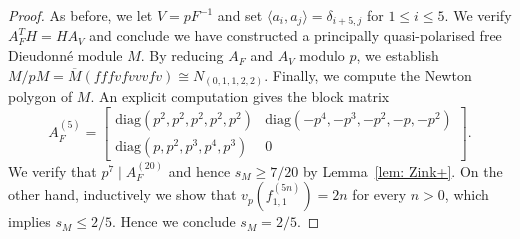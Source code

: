 \documentclass[11pt,table]{amsart}
\numberwithin{equation}{section}
\theoremstyle{definition}
\theoremstyle{remark}
\theoremstyle{remark}
\begin{document}
\begin{proof}
As before, we let $V=pF^{-1}$ and set $\langle a_i,a_j\rangle=\delta_{i+5,j}$ for $1\leq i \leq 5$. We verify $A_F^TH=HA_V$ and conclude we have constructed a principally quasi-polarised free Dieudonn\'{e} module $M$. By reducing $A_F$ and $A_V$ modulo $p$, we establish $M/pM=\overline{M}(fffvfvvvfv) \cong N_{(0,1,1,2,2)}.$ Finally, we compute the Newton polygon of $M$. An explicit computation gives the block matrix
\[
A_F^{(5)} = \begin{bmatrix}
    \mathrm{diag}(p^2, p^2, p^2, p^2, p^2) & \mathrm{diag}(-p^4, -p^3, -p^2, -p, -p^2) \\
    \mathrm{diag}(p, p^2, p^3, p^4, p^3) & 0
\end{bmatrix}.
\]
We verify that $p^7 \mid A_F^{(20)}$ and hence $s_M\geq 7/20$ by Lemma~\ref{lem: Zink+}. On the other hand, inductively we show that  $v_p(f_{1,1}^{(5n)})=2n$ for every $n>0$, which implies $s_M \leq 2/5$. Hence we conclude $s_M=2/5$.

\end{proof}
\end{document}
